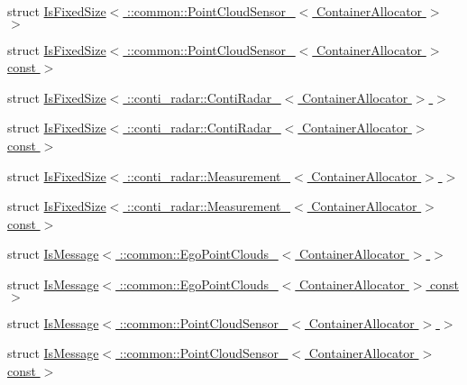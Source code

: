\begin{DoxyCompactItemize}
\item 
struct \hyperlink{structros_1_1message__traits_1_1IsFixedSize_3_01_1_1common_1_1PointCloudSensor___3_01ContainerAllocator_01_4_01_4}{Is\+Fixed\+Size$<$ \+::common\+::\+Point\+Cloud\+Sensor\+\_\+$<$ Container\+Allocator $>$ $>$}
\item 
struct \hyperlink{structros_1_1message__traits_1_1IsFixedSize_3_01_1_1common_1_1PointCloudSensor___3_01ContainerAllocator_01_4_01const_01_4}{Is\+Fixed\+Size$<$ \+::common\+::\+Point\+Cloud\+Sensor\+\_\+$<$ Container\+Allocator $>$ const $>$}
\item 
struct \hyperlink{structros_1_1message__traits_1_1IsFixedSize_3_01_1_1conti__radar_1_1ContiRadar___3_01ContainerAllocator_01_4_01_4}{Is\+Fixed\+Size$<$ \+::conti\+\_\+radar\+::\+Conti\+Radar\+\_\+$<$ Container\+Allocator $>$ $>$}
\item 
struct \hyperlink{structros_1_1message__traits_1_1IsFixedSize_3_01_1_1conti__radar_1_1ContiRadar___3_01ContainerAllocator_01_4_01const_01_4}{Is\+Fixed\+Size$<$ \+::conti\+\_\+radar\+::\+Conti\+Radar\+\_\+$<$ Container\+Allocator $>$ const $>$}
\item 
struct \hyperlink{structros_1_1message__traits_1_1IsFixedSize_3_01_1_1conti__radar_1_1Measurement___3_01ContainerAllocator_01_4_01_4}{Is\+Fixed\+Size$<$ \+::conti\+\_\+radar\+::\+Measurement\+\_\+$<$ Container\+Allocator $>$ $>$}
\item 
struct \hyperlink{structros_1_1message__traits_1_1IsFixedSize_3_01_1_1conti__radar_1_1Measurement___3_01ContainerAllocator_01_4_01const_01_4}{Is\+Fixed\+Size$<$ \+::conti\+\_\+radar\+::\+Measurement\+\_\+$<$ Container\+Allocator $>$ const $>$}
\item 
struct \hyperlink{structros_1_1message__traits_1_1IsMessage_3_01_1_1common_1_1EgoPointClouds___3_01ContainerAllocator_01_4_01_4}{Is\+Message$<$ \+::common\+::\+Ego\+Point\+Clouds\+\_\+$<$ Container\+Allocator $>$ $>$}
\item 
struct \hyperlink{structros_1_1message__traits_1_1IsMessage_3_01_1_1common_1_1EgoPointClouds___3_01ContainerAllocator_01_4_01const_01_4}{Is\+Message$<$ \+::common\+::\+Ego\+Point\+Clouds\+\_\+$<$ Container\+Allocator $>$ const $>$}
\item 
struct \hyperlink{structros_1_1message__traits_1_1IsMessage_3_01_1_1common_1_1PointCloudSensor___3_01ContainerAllocator_01_4_01_4}{Is\+Message$<$ \+::common\+::\+Point\+Cloud\+Sensor\+\_\+$<$ Container\+Allocator $>$ $>$}
\item 
struct \hyperlink{structros_1_1message__traits_1_1IsMessage_3_01_1_1common_1_1PointCloudSensor___3_01ContainerAllocator_01_4_01const_01_4}{Is\+Message$<$ \+::common\+::\+Point\+Cloud\+Sensor\+\_\+$<$ Container\+Allocator $>$ const $>$}

\end{DoxyCompactItemize}
